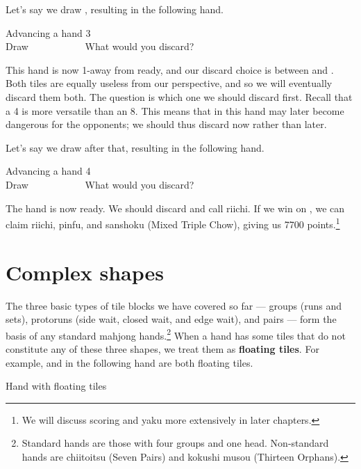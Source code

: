 \bigskip
Let's say we draw {\LARGE{}}, resulting in the following hand. 
\begin{itembox}[r]{Advancing a hand 3}
\bp
{}~\\
\hfill\footnotesize{Draw~~~~~~~~~~~}
\ep
\vspace{-17pt}What would you discard? \vspace{-5pt}
\end{itembox}
\noindent
This hand is now 1-away from ready, and our discard choice is between {\LARGE{}} and {\LARGE{}}. Both tiles are equally useless from our perspective, and so we will eventually discard them both. The question is which one we should discard first. Recall that a 4 is more versatile than an 8. This means that {\LARGE{}} in this hand may later become dangerous for the opponents; we should thus discard {\LARGE{}} now rather than later. 

\bigskip
Let's say we draw {\LARGE{}} after that, resulting in the following hand.
\begin{itembox}[r]{Advancing a hand 4}
\bp
{}~\\
\hfill\footnotesize{Draw~~~~~~~~~~~}
\ep
\vspace{-17pt}What would you discard? \vspace{-5pt}
\end{itembox}
\noindent
The hand is now ready. We should discard {\LARGE{}} and call riichi. If we win on {\LARGE{}}, we can claim riichi, {\jap pinfu}, and {\jap sanshoku} (Mixed Triple Chow), giving us 7700 points.\footnote{We will discuss scoring and {\jap yaku} more extensively in later chapters.}

\newpage
\section{Complex shapes}
The three basic types of tile blocks we have covered so far --- groups (runs and sets), protoruns (side wait, closed wait, and edge wait), and pairs --- form the basis of any standard mahjong hands.\footnote{Standard hands are those with four groups and one head. Non-standard hands are {\jap chiitoitsu} (Seven Pairs) and {\jap kokushi musou} (Thirteen Orphans).}  
When a hand has some tiles that do not constitute any of these three shapes, we treat them as {\bf floating tiles}. For example, {\LARGE{}} and {\LARGE{}} in the following hand are both floating tiles. 
\bigskip
\begin{itembox}[r]{Hand with floating tiles}
\bp
{}
\ep
\end{itembox}

